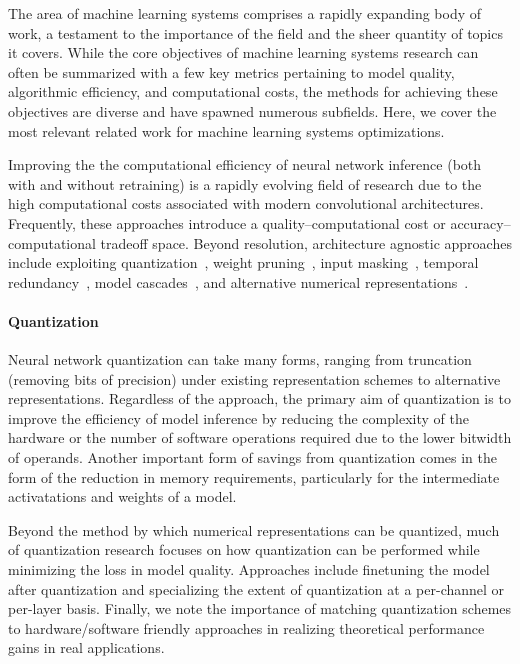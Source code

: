 The area of machine learning systems comprises a rapidly expanding body of work, a testament to the importance of the field and the sheer quantity of topics it covers.
While the core objectives of machine learning systems research can often be summarized with a few key metrics pertaining to model quality, algorithmic efficiency, and computational costs, the methods for achieving these objectives are diverse and have spawned numerous subfields.
Here, we cover the most relevant related work for machine learning systems optimizations.


Improving the the computational efficiency of neural network inference (both with and without retraining) is a rapidly evolving field of research due to the high computational costs associated with modern convolutional architectures.
Frequently, these approaches introduce a quality--computational cost or accuracy--computational tradeoff space.
Beyond resolution, architecture agnostic approaches include exploiting quantization~\cite{rastegari2016xnor, zhou2016dorefa, fromm2020riptide}, weight pruning~\cite{ji2018tetris, frankle2018lottery}, input masking~\cite{yang2018energy}, temporal redundancy~\cite{buckler2018eva2}, model cascades~\cite{shen2017fast}, and alternative numerical representations~\cite{kim2016dynamic, lee2017energy, kalamkar2019study}.

\paragraph{Quantization}
Neural network quantization can take many forms, ranging from truncation (removing bits of precision) under existing representation schemes to alternative representations.
Regardless of the approach, the primary aim of quantization is to improve the efficiency of model inference by reducing the complexity of the hardware or the number of software operations required due to the lower bitwidth of operands.
Another important form of savings from quantization comes in the form of the reduction in memory requirements, particularly for the intermediate activatations and weights of a model.

Beyond the method by which numerical representations can be quantized, much of quantization research focuses on how quantization can be performed while minimizing the loss in model quality.
Approaches include finetuning the model after quantization and specializing the extent of quantization at a per-channel or per-layer basis.
Finally, we note the importance of matching quantization schemes to hardware/software friendly approaches in realizing theoretical performance gains in real applications.

